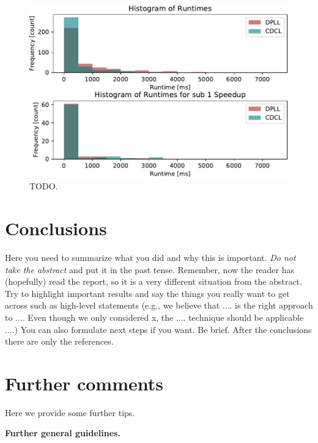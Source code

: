 \documentclass[letterpaper]{article}
\newcommand{\mypar}[1]{{\bf #1.}}
\begin{document}
\begin{figure}
  \centering
  \includegraphics[width=\columnwidth]{figures/dpll_vs_cdcl_histo}
  \caption{TODO.\label{dpll_vs_cdcl_speedup}}
\end{figure}

\section{Conclusions}

Here you need to summarize what you did and why this is
important. {\em Do not take the abstract} and put it in the past
tense. Remember, now the reader has (hopefully) read the report, so it
is a very different situation from the abstract. Try to highlight
important results and say the things you really want to get across
such as high-level statements (e.g., we believe that .... is the right
approach to .... Even though we only considered x, the
.... technique should be applicable ....) You can also formulate next
steps if you want. Be brief. After the conclusions there are only the references.

\section{Further comments}

Here we provide some further tips.

\mypar{Further general guidelines}
\end{document}
